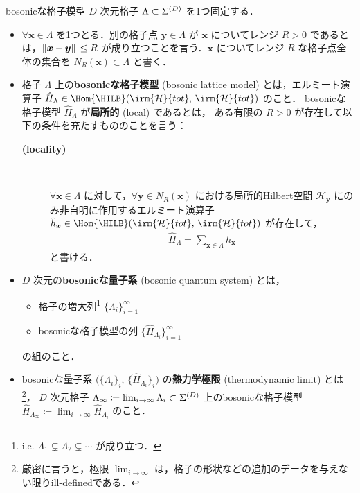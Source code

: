 \documentclass[TQFT_main]{subfiles}
\begin{document}
\begin{mydefph}[label=def:bosonic-lattice-model,breakable]{bosonicな格子模型}
    $D$ 次元格子 $\Lambda \subset \Sigma^{(D)}$ を1つ固定する．
    \begin{itemize}
        \item $\forall \bm{x} \in \Lambda$ を1つとる．別の格子点 $\bm{y} \in \Lambda$ が $\bm{x}$ についてレンジ $R > 0$ であるとは，$\norm*{\bm{x} - \bm{y}} \le R$ が成り立つことを言う．$\bm{x}$ についてレンジ $R$ な格子点全体の集合を $N_R (\bm{x}) \subset \Lambda$ と書く．
        \item \underline{格子 $\Lambda$ 上の}\textbf{bosonicな格子模型} (bosonic lattice model) とは，エルミート演算子 $\hat{H}_{\Lambda} \in \Hom{\HILB} (\irm{\mathcal{H}}{tot},\, \irm{\mathcal{H}}{tot})$ のこと．
        bosonicな格子模型 $\hat{H}_\Lambda$ が\textbf{局所的} (local) であるとは，
        ある有限の $R > 0$ が存在して以下の条件を充たすもののことを言う：
        \begin{description}
            \item[\textbf{(locality)}]　
            
            $\forall \bm{x} \in \Lambda$ に対して，$\forall \bm{y} \in N_R(\bm{x})$ における局所的Hilbert空間 $\mathcal{H}_{\bm{y}}$ にのみ非自明に作用するエルミート演算子 $\hat{h}_{\bm{x}} \in \Hom{\HILB} (\irm{\mathcal{H}}{tot},\, \irm{\mathcal{H}}{tot})$ が存在して，
            \begin{align}
                \hat{H}_{\Lambda} = \sum_{\bm{x} \in \Lambda} \hat{h}_{\bm{x}}
            \end{align}
            と書ける．
        \end{description}
        
    \end{itemize}
    
    \tcblower

    \begin{itemize}
        \item $D$ 次元の\textbf{bosonicな量子系} (bosonic quantum system) とは，
        \begin{itemize}
            \item 格子の増大列\footnote{i.e. $\Lambda_1 \subsetneq \Lambda_2 \subsetneq \cdots$ が成り立つ．} $\{\Lambda_i\}_{i=1}^\infty$
            \item bosonicな格子模型の列 $\{\hat{H}_{\Lambda_i}\}_{i=1}^\infty$
        \end{itemize}
        の組のこと．
        \item bosonicな量子系 $\bigl( \{\Lambda_i\}_i,\, \{\hat{H}_{\Lambda_i}\}_i \bigr)$ の\textbf{熱力学極限} (thermodynamic limit) とは\footnote{厳密に言うと，極限 $\lim_{i \to \infty}$ は，格子の形状などの追加のデータを与えない限りill-definedである．}，
        $D$ 次元格子 $\Lambda_\infty \coloneqq \lim_{i \to \infty} \Lambda_i \subset \Sigma^{(D)}$ 上のbosonicな格子模型
        $\hat{H}_{\Lambda_\infty} \coloneqq \lim_{i \to \infty} \hat{H}_{\Lambda_i}$ のこと．
    \end{itemize}
    
\end{mydefph}
\end{document}
